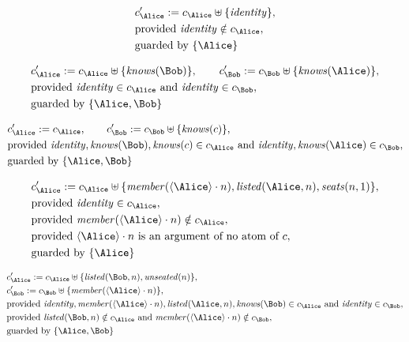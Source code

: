 \begin{align*}
&
c'_
{
\Alice
}
 := 
c_
{
\Alice
}
 \uplus 
\{
\mathit{
identity
}
\}
,\\
&
\text{provided } 
\mathit{
identity
}
 \notin c_
{
\Alice
}
,\\
&
\text{guarded by } \{
\Alice
\}
\end{align*}

\begin{align*}
&
c'_
{
\Alice
}
 := 
c_
{
\Alice
}
 \uplus 
\{
\mathit{
knows
}
(
\Bob
)
\}
, \qquad 
c'_
{
\Bob
}
 := 
c_
{
\Bob
}
 \uplus 
\{
\mathit{
knows
}
(
\Alice
)
\}
,\\
&
\text{provided } 
\mathit{
identity
}
 \in c_
{
\Alice
}
 \text{ and } 
\mathit{
identity
}
 \in c_
{
\Bob
}
,\\
&
\text{guarded by } \{
\Alice
,
\Bob
\}
\end{align*}

\begin{align*}
&
c'_
{
\Alice
}
 := 
c_
{
\Alice
}
, \qquad 
c'_
{
\Bob
}
 := 
c_
{
\Bob
}
 \uplus 
\{
\mathit{
knows
}
(
c
)
\}
,\\
&
\text{provided } 
\mathit{
identity
}
,
\mathit{
knows
}
(
\Bob
)
,
\mathit{
knows
}
(
c
)
 \in c_
{
\Alice
}
 \text{ and } 
\mathit{
identity
}
,
\mathit{
knows
}
(
\Alice
)
 \in c_
{
\Bob
}
,\\
&
\text{guarded by } \{
\Alice
,
\Bob
\}
\end{align*}

\begin{align*}
&
c'_
{
\Alice
}
 := 
c_
{
\Alice
}
 \uplus 
\{
\mathit{
member
}
(
\langle
\Alice
\rangle
\cdot
n
)
,
\mathit{
listed
}
(
\Alice
,
n
)
,
\mathit{
seats
}
(
n
,
1
)
\}
,\\
&
\text{provided } 
\mathit{
identity
}
 \in c_
{
\Alice
}
,\\
&
\text{provided } 
\mathit{
member
}
(
\langle
\Alice
\rangle
\cdot
n
)
 \notin c_
{
\Alice
}
,\\
&
\text{provided } 
\langle
\Alice
\rangle
\cdot
n
 \text{ is an argument of no atom of } c
,\\
&
\text{guarded by } \{
\Alice
\}
\end{align*}

\begin{align*}
&
c'_
{
\Alice
}
 := 
c_
{
\Alice
}
 \uplus 
\{
\mathit{
listed
}
(
\Bob
,
n
)
,
\mathit{
unseated
}
(
n
)
\}
,\\
&
c'_
{
\Bob
}
 := 
c_
{
\Bob
}
 \uplus 
\{
\mathit{
member
}
(
\langle
\Alice
\rangle
\cdot
n
)
\}
,\\
&
\text{provided } 
\mathit{
identity
}
,
\mathit{
member
}
(
\langle
\Alice
\rangle
\cdot
n
)
,
\mathit{
listed
}
(
\Alice
,
n
)
,
\mathit{
knows
}
(
\Bob
)
 \in c_
{
\Alice
}
 \text{ and } 
\mathit{
identity
}
 \in c_
{
\Bob
}
,\\
&
\text{provided } 
\mathit{
listed
}
(
\Bob
,
n
)
 \notin c_
{
\Alice
}
 \text{ and } 
\mathit{
member
}
(
\langle
\Alice
\rangle
\cdot
n
)
 \notin c_
{
\Bob
}
,\\
&
\text{guarded by } \{
\Alice
,
\Bob
\}
\end{align*}
